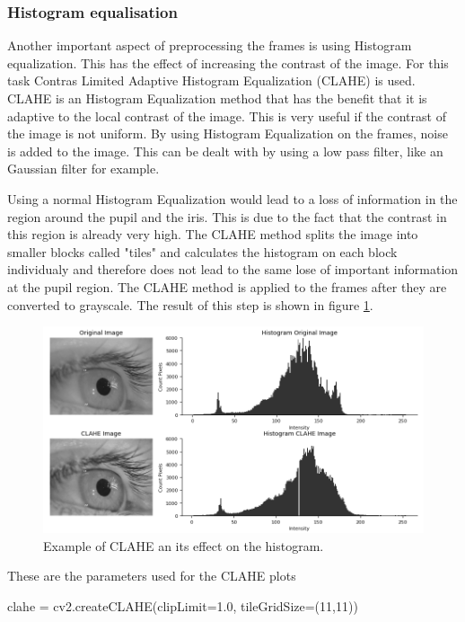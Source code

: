 \subsubsection{Histogram equalisation}
Another important aspect of preprocessing the frames is using Histogram equalization. This has the effect of increasing the contrast of the image. For this task Contras Limited Adaptive Histogram Equalization (CLAHE)\cite{clahe} is used. CLAHE is an Histogram Equalization method that has the benefit that it is adaptive to the local contrast of the image. This is very useful if the contrast of the image is not uniform. By using Histogram Equalization on the frames, noise is added to the image. This can be dealt with by using a low pass filter, like an Gaussian filter for example.

 Using a normal Histogram Equalization would lead to a loss of information in the region around the pupil and the iris. This is due to the fact that the contrast in this region is already very high. The CLAHE method splits the image into smaller blocks called "tiles"  and calculates the histogram on each block individualy and therefore does not lead to the same lose of important information at the pupil region. The CLAHE method is applied to the frames after they are converted to grayscale. The result of this step is shown in figure \ref{fig:clahe}. 

\begin{figure}[h]
    \centering
    \includegraphics[width=1\textwidth]{plots/clahe.png}
    \caption{Example of CLAHE an its effect on the histogram.}
    \label{fig:clahe}
\end{figure}
These are the parameters used for the CLAHE plots
\begin{python}
    clahe = cv2.createCLAHE(clipLimit=1.0, tileGridSize=(11,11))
\end{python}

